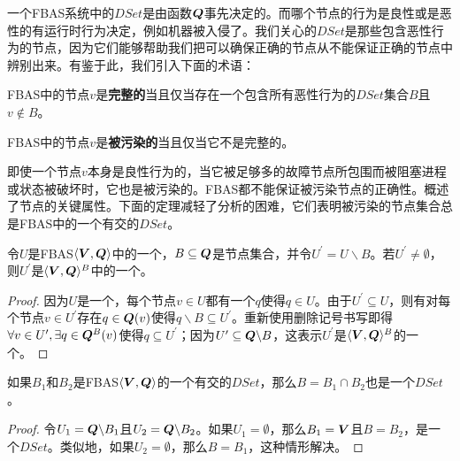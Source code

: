 一个FBAS系统中的$DSet$是由{\quorum}函数${\bm Q}$事先决定的。而哪个节点的行为是良性或是恶性的有运行时行为决定，例如机器被入侵了。我们关心的$DSet$是那些包含恶性行为的节点，因为它们能够帮助我们把可以确保正确的节点从不能保证正确的节点中辨别出来。有鉴于此，我们引入下面的术语：

\begin{definition}[完整的]
	FBAS中的节点$v$是\textbf{完整的}当且仅当存在一个包含所有恶性行为的$DSet$集合$B$且$v\not\in B$。
\end{definition}

\begin{definition}[被污染的]
	FBAS中的节点$v$是\textbf{被污染的}当且仅当它不是完整的。
\end{definition}

即使一个节点$v$本身是良性行为的，当它被足够多的故障节点所包围而被阻塞进程或状态被破坏时，它也是被污染的。FBAS都不能保证被污染节点的正确性。概述了节点的关键属性。下面的定理减轻了分析的困难，它们表明被污染的节点集合总是FBAS中的一个有{\quorum}交的$DSet$。

\begin{theorem}
	令$U$是FBAS$\langle{\bm V},{\bm Q}\rangle$中的一个{\quorum}，$B\subseteq {\bm Q}$是节点集合，并令$U^\prime=U\backslash B$。若$U^\prime\neq \emptyset$，则$U^\prime$是$\langle{\bm V},{\bm Q}\rangle^B$中的一个{\quorum}。
\end{theorem}

\begin{proof}
	因为$U$是一个{\quorum}，每个节点$v\in U$都有一个$q$使得$q\in U$。由于$U^\prime\subseteq U$，则有对每个节点$v\in U^\prime$存在$q\in{\bm Q}(v)$使得$q\backslash B\subseteq U^\prime$。重新使用删除记号书写即得$\forall v\in U^\prime,\exists q\in{\bm Q}^B(v)$使得$q\subseteq U^\prime$；因为$U^\prime \subseteq {\bm Q}\backslash B$，这表示$U^\prime$是$\langle{\bm V},{\bm Q}\rangle^B$的一个{\quorum}。
\end{proof}

\begin{theorem}
	如果$B_1$和$B_2$是FBAS$\langle{\bm V},{\bm Q}\rangle$的一个有{\quorum}交的$DSet$，那么$B=B_1\cap B_2$也是一个$DSet$。
\end{theorem}

\begin{proof}
	令$U_1={\bm Q}\backslash B_1$且$U_2={\bm Q}\backslash B_2$。如果$U_1=\emptyset$，那么$B_1={\bm V}$且$B=B_2$，是一个$DSet$。类似地，如果$U_2=\emptyset$，那么$B=B_1$，这种情形解决。
\end{proof}